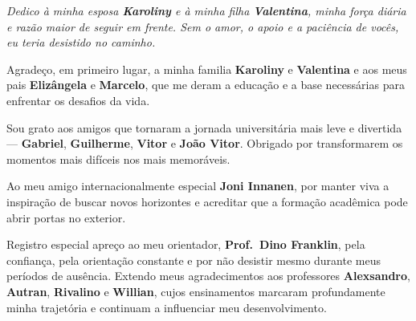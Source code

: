 \documentclass[12pt, %
openright, 
oneside, %
a4paper,    %
brazil]{facom-ufu-abntex2}
\begin{document}
\begin{dedicatoria}
   \vspace*{\fill}
   \centering
   \noindent
   \textit{Dedico à minha esposa \textbf{Karoliny} e à minha filha \textbf{Valentina}, minha força diária e razão maior de seguir em frente. Sem o amor, o apoio e a paciência de vocês, eu teria desistido no caminho.}
   \vspace*{\fill}
\end{dedicatoria}

\begin{agradecimentos}
    Agradeço, em primeiro lugar, a minha familia \textbf{Karoliny} e \textbf{Valentina} e aos meus pais \textbf{Elizângela} e \textbf{Marcelo}, que me deram a educação e a base necessárias para enfrentar os desafios da vida.

    Sou grato aos amigos que tornaram a jornada universitária mais leve e divertida — \textbf{Gabriel}, \textbf{Guilherme}, \textbf{Vitor} e \textbf{João Vitor}. Obrigado por transformarem os momentos mais difíceis nos mais memoráveis.
    
    Ao meu amigo internacionalmente especial \textbf{Joni Innanen}, por manter viva a inspiração de buscar novos horizontes e acreditar que a formação acadêmica pode abrir portas no exterior.
    
    Registro especial apreço ao meu orientador, \textbf{Prof.\ Dino Franklin}, pela confiança, pela orientação constante e por não desistir mesmo durante meus períodos de ausência. Extendo meus agradecimentos aos professores \textbf{Alexsandro}, \textbf{Autran}, \textbf{Rivalino} e \textbf{Willian}, cujos ensinamentos marcaram profundamente minha trajetória e continuam a influenciar meu desenvolvimento.
\end{agradecimentos}


\end{document}
